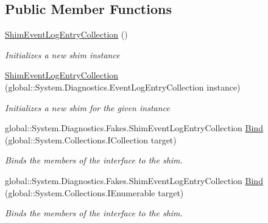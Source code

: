 \subsection*{Public Member Functions}
\begin{DoxyCompactItemize}
\item 
\hyperlink{class_system_1_1_diagnostics_1_1_fakes_1_1_shim_event_log_entry_collection_adb170a84fe4fb3f8f85095504b5f3a0d}{Shim\-Event\-Log\-Entry\-Collection} ()
\begin{DoxyCompactList}\small\item\em Initializes a new shim instance\end{DoxyCompactList}\item 
\hyperlink{class_system_1_1_diagnostics_1_1_fakes_1_1_shim_event_log_entry_collection_aa41cf803c21e4d7daa5c278a828a5970}{Shim\-Event\-Log\-Entry\-Collection} (global\-::\-System.\-Diagnostics.\-Event\-Log\-Entry\-Collection instance)
\begin{DoxyCompactList}\small\item\em Initializes a new shim for the given instance\end{DoxyCompactList}\item 
global\-::\-System.\-Diagnostics.\-Fakes.\-Shim\-Event\-Log\-Entry\-Collection \hyperlink{class_system_1_1_diagnostics_1_1_fakes_1_1_shim_event_log_entry_collection_a296e9f7b65831286ad9e6188a3f0a32d}{Bind} (global\-::\-System.\-Collections.\-I\-Collection target)
\begin{DoxyCompactList}\small\item\em Binds the members of the interface to the shim.\end{DoxyCompactList}\item 
global\-::\-System.\-Diagnostics.\-Fakes.\-Shim\-Event\-Log\-Entry\-Collection \hyperlink{class_system_1_1_diagnostics_1_1_fakes_1_1_shim_event_log_entry_collection_a792810bea439c35d7bca8fad3df307bf}{Bind} (global\-::\-System.\-Collections.\-I\-Enumerable target)
\begin{DoxyCompactList}\small\item\em Binds the members of the interface to the shim.\end{DoxyCompactList}\end{DoxyCompactItemize}
